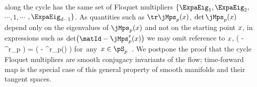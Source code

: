 {along the cycle has the same set of Floquet multipliers
$\{\ExpaEig_{1}, \ExpaEig_{2},$
$\cdots, 1,\cdots$ $,\ExpaEig_{d-1}\}$.
 As quantities such as $\tr \jMps_{p}(\ssp)$, $\det \jMps_{p}(\ssp)$ depend
only on the eigenvalues of $\jMps_{p}(\ssp)$ and not on
the starting point $x$, in expressions such as
$ \det \! \left( \matId - \jMps^{r}_{p}(\ssp) \right)$
we may omit reference to $x$,
\beq
\det \! \left( \matId - \jMps^{r}_{p} \right)
            =
\det \! \left( \matId - \jMps^{r}_{p}(\ssp) \right)
\quad \mbox{for any $\ssp \in \pS_p $}
\,.
We postpone the proof that the cycle Floquet multipliers are smooth
conjugacy invariants of the flow; %
time-forward map  is the special case of this
general property of smooth manifolds and their tangent spaces.
    } %
